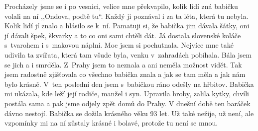 Procházely jsme se i po vesnici, velice mne překvapilo, kolik lidí zná babičku volali na ní ,,Ondova, poďtě tu``. Každý ji poznával i za ta léta, která tu nebyla. Kolik lidí jí znalo a hlásilo se k ní. Pamatuji si, že babička jim dávala šátky, oni jí dávali špek, škvarky a to co oni sami chtěli dát. Já dostala slovenské koláče s tvarohem i s makovou náplní. Moc jsem si pochutnala. Nejvíce mne také udivila ta zvířata, která tam všude byla, venku v zahradách pobíhala. Bála jsem se jich a i smrděla. Z Prahy jsem to neznala a ani neměla možnost vidět. Tak jsem radostně zjišťovala co všechno babička znala a jak se tam měla a jak nám bylo krásně. V ten poslední den jsem s babičkou ráno odešly na hřbitov. Babička mi ukázala, kde leží její rodiče, manžel i syn. Upravila hroby, zalila kytky, chvíli postála sama a pak jsme odjely zpět domů do Prahy. V dnešní době ten baráček dávno nestojí. Babička se dožila krásného věku 93 let. Už také nežije, už není, ale vzpomínky mi na ní zůstaly krásné i bolavé, protože tu není se mnou.

